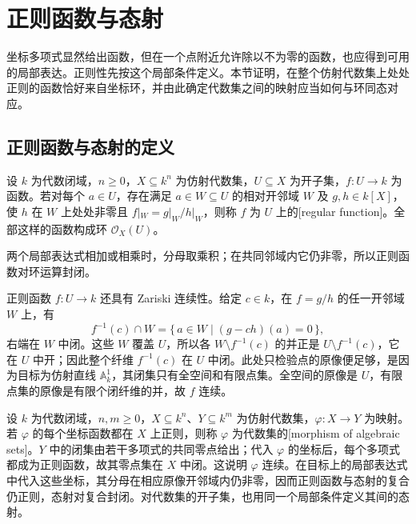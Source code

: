 
\section{正则函数与态射}
\label{b3:sec:0702}

坐标多项式显然给出函数，但在一个点附近允许除以不为零的函数，也应得到可用的局部表达。正则性先按这个局部条件定义。本节证明，在整个仿射代数集上处处正则的函数恰好来自坐标环，并由此确定代数集之间的映射应当如何与环同态对应。

\subsection{正则函数与态射的定义}
\label{b3:subsec:0702:01}

\begin{definition}\label{b3:def:regular-function}
	设 \(k\) 为代数闭域，\(n\ge0\)，\(X\subseteq k^n\) 为仿射代数集，\(U\subseteq X\) 为开子集，\(f:U\to k\) 为函数。若对每个 \(a\in U\)，存在满足 \(a\in W\subseteq U\) 的相对开邻域 \(W\) 及 \(g,h\in k[X]\)，使 \(h\) 在 \(W\) 上处处非零且 \(f|_W=g|_W/h|_W\)，则称 \(f\) 为 \(U\) 上的[regular function]。全部这样的函数构成环 \(\mathcal O_X(U)\)。
\end{definition}

两个局部表达式相加或相乘时，分母取乘积；在共同邻域内它仍非零，所以正则函数对环运算封闭。

\ProseParagraphBreak
正则函数 \(f:U\rightarrow k\) 还具有 Zariski 连续性。给定 \(c\in k\)，在 \(f=g/h\) 的任一开邻域 \(W\) 上，有
\[
	f^{-1}(c)\cap W=\{\,a\in W\mid (g-ch)(a)=0\,\},
\]
右端在 \(W\) 中闭。这些 \(W\) 覆盖 \(U\)，所以各 \(W\setminus f^{-1}(c)\) 的并正是 \(U\setminus f^{-1}(c)\)，它在 \(U\) 中开；因此整个纤维 \(f^{-1}(c)\) 在 \(U\) 中闭。此处只检验点的原像便足够，是因为目标为仿射直线 \(\mathbb A_k^1\)，其闭集只有全空间和有限点集。全空间的原像是 \(U\)，有限点集的原像是有限个闭纤维的并，故 \(f\) 连续。

\ProseParagraphBreak
设 \(k\) 为代数闭域，\(n,m\ge0\)，\(X\subseteq k^n\)、\(Y\subseteq k^m\) 为仿射代数集，\(\varphi:X\to Y\) 为映射。若 \(\varphi\) 的每个坐标函数都在 \(X\) 上正则，则称 \(\varphi\) 为代数集的[morphism of algebraic sets]。\(Y\) 中的闭集由若干多项式的共同零点给出；代入 \(\varphi\) 的坐标后，每个多项式都成为正则函数，故其零点集在 \(X\) 中闭。这说明 \(\varphi\) 连续。在目标上的局部表达式中代入这些坐标，其分母在相应原像开邻域内仍非零，因而正则函数与态射的复合仍正则，态射对复合封闭。对代数集的开子集，也用同一个局部条件定义其间的态射。

